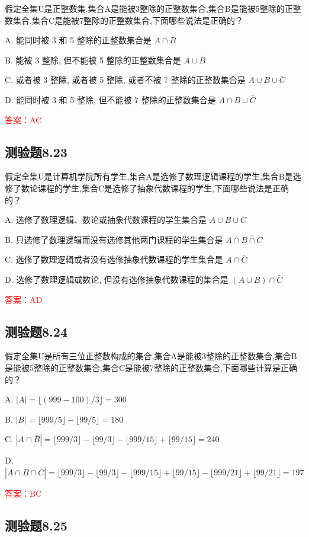 \documentclass[UTF8, heading=true]{ctexart}
\begin{document}
假定全集U是正整数集,集合A是能被3整除的正整数集合,集合B是能被5整除的正整数集合,集合C是能被7整除的正整数集合,下面哪些说法是正确的？

A. 能同时被 3 和 5 整除的正整数集合是 $A \cap B$

B. 能被 3 整除, 但不能被 5 整除的正整数集合是 $A \cup \bar{B}$

C. 或者被 3 整除, 或者被 5 整除, 或者不被 7 整除的正整数集合是 $A \cup B \cup \bar{C}$

D. 能同时被 3 和 5 整除, 但不能被 7 整除的正整数集合是 $A \cap B \cup \bar{C}$

\textcolor{red}{答案：AC}
\subsection{测验题8.23}

假定全集U是计算机学院所有学生,集合A是选修了数理逻辑课程的学生,集合B是选修了数论课程的学生,集合C是选修了抽象代数课程的学生,下面哪些说法是正确的？

A. 选修了数理逻辑、数论或抽象代数课程的学生集合是 $A \cup B \cup C$

B. 只选修了数理逻辑而没有选修其他两门课程的学生集合是 $A \cap \overline{B \cap C}$

C. 选修了数理逻辑或者没有选修抽象代数课程的学生集合是 $A \cap \bar{C}$

D. 选修了数理逻辑或数论, 但没有选修抽象代数课程的集合是 $(A \cup B) \cap \bar{C}$

\textcolor{red}{答案：AD}

\subsection{测验题8.24}
假定全集U是所有三位正整数构成的集合,集合A是能被3整除的正整数集合,集合B是能被5整除的正整数集合,集合C是能被7整除的正整数集合,下面哪些计算是正确的？

A. $|A|=\lfloor(999-100) / 3\rfloor=300$

B. $|B|=\lfloor 999 / 5\rfloor-\lfloor 99 / 5\rfloor=180$

C. $|A \cap \bar{B}|=\lfloor 999 / 3\rfloor-\lfloor 99 / 3\rfloor-\lfloor 999 / 15\rfloor+\lfloor 99 / 15\rfloor=240$

D. $|A \cap \bar{B} \cap \bar{C}|=\lfloor 999 / 3\rfloor-\lfloor 99 / 3\rfloor-\lfloor 999 / 15\rfloor+\lfloor 99 / 15\rfloor-\lfloor 999 / 21\rfloor+\lfloor 99 / 21\rfloor=197$

\textcolor{red}{答案：BC}

\subsection{测验题8.25}
\end{document}

